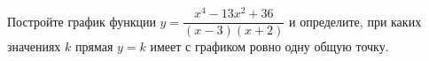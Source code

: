 \begin{ex}
	\begin{condition}
		Постройте график функции $y=\dfrac{x^4-13x^2+36}{(x-3)(x+2)}$ и определите, при каких значениях $k$ прямая $y=k$ имеет с графиком ровно одну общую точку.
	\end{condition}
\end{ex}